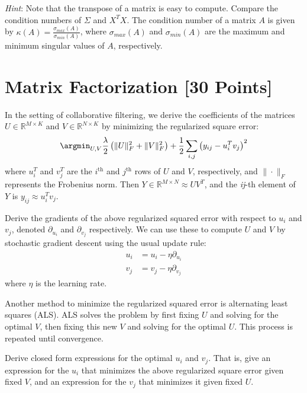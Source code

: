 \textit{Hint}: Note that the transpose of a matrix is easy to compute. Compare the condition numbers of $\Sigma$ and $X^T X$. The condition number of a matrix $A$ is given by $\kappa(A) = \frac{\sigma_{max}(A)}{\sigma_{min}(A)}$, where $\sigma_{max}(A)$ and $\sigma_{min}(A)$ are the maximum and minimum singular values of $A$, respectively.

\begin{solution}
  \end{solution}


\newpage
\section{Matrix Factorization [30 Points]}

In the setting of collaborative filtering, we derive the coefficients of the matrices $U \in \mathbb{R}^{M \times K}$ and $V \in \mathbb{R}^{N \times K}$ by minimizing the regularized square error:
$$\argmin_{U,V} \frac{\lambda}{2} \left( \|U\|_F^2 + \|V\|^2_F \right) + \frac{1}{2}\sum_{i,j} \left( y_{ij} - u_i^Tv_j\right)^2$$
where $u_i^T$ and $v_j^T$ are the $i^{\text{th}}$ and $j^{\text{th}}$ rows of $U$ and $V$, respectively, and $\|\cdot\|_F$ represents the Frobenius norm. Then $Y \in \mathbb{R}^{M \times N} \approx UV^T$, and the \textit{ij}-th element of $Y$ is $y_{ij} \approx u_i^Tv_j$.

\problem[5]
Derive the gradients of the above regularized squared error with respect to $u_i$ and $v_j$, denoted $\partial_{u_i}$ and $\partial_{v_j}$ respectively.  We can use these to compute $U$ and $V$ by stochastic gradient descent using the usual update rule: 
\begin{align*}
u_i &= u_i - \eta \partial_{u_i} \\
v_j &= v_j - \eta \partial_{v_j}
\end{align*}
where $\eta$ is the learning rate.

\begin{solution}
\end{solution}

\problem[5]
Another method to minimize the regularized squared error is alternating least squares (ALS). ALS solves the problem by first fixing $U$ and solving for the optimal $V$, then fixing this new $V$ and solving for the optimal $U$.  This process is repeated until convergence.

Derive closed form expressions for the optimal $u_i$ and $v_j$.  That is, give an expression for the $u_i$ that minimizes the above regularized square error given fixed $V$, and an expression for the $v_j$ that minimizes it given fixed $U$.

